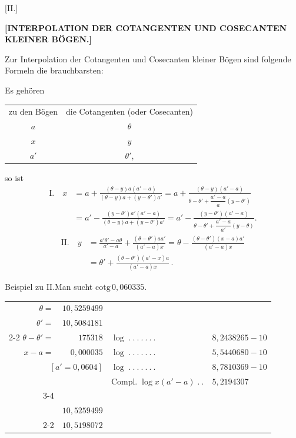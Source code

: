 \clearpage{}
\begin{center}
[II.]

\medskip
\textbf{[INTERPOLATION DER COTANGENTEN UND COSECANTEN KLEINER BÖGEN.]}
\end{center}

Zur Interpolation der Cotangenten und Cosecanten kleiner Bögen sind
folgende Formeln die brauchbarsten:

Es gehören
\begin{center}
\begin{tabular}{cc}
zu den Bögen & die Cotangenten (oder Cosecanten) \\
$a$ & $\theta$ \\
$x$ & $y$ \\
$a'$ & $\theta'$, \\
\end{tabular}
\end{center}
so ist
\[
\begin{aligned}
\mathrm{I.}\quad x &= a+\frac{(\theta-y)a(a'-a)}{(\theta-y)a+(y-\theta')a'}
=a+\frac{(\theta-y)(a'-a)}{\theta-\theta'+\dfrac{a'-a}{a}(y-\theta')}\\[5pt]
&=a'-\frac{(y-\theta')a'(a'-a)}{(\theta-y)a+(y-\theta')a'}
=a'-\frac{(y-\theta')(a'-a)}{\theta-\theta'+\dfrac{a'-a}{a'}(y-\theta)}.
\end{aligned}
\]
\[
\begin{aligned}
\mathrm{II.}\quad y&=\frac{a'\theta'-a\theta}{a'-a}+\frac{(\theta-\theta')aa'}{(a'-a)x}
=\theta-\frac{(\theta-\theta')(x-a)a'}{(a'-a)x}\\[5pt]
&=\theta'+\frac{(\theta-\theta')(a'-x)a}{(a'-a)x}\,.
\end{aligned}
\]

Beispiel zu II.\quad Man sucht $\mathrm{cotg}\,0{,}060335$.
\begin{center}\small
\begin{tabular}{r@{\;}r@{\quad}l@{\;}l}
$\theta=$ & $10{,}5259499$ &&\\
$\theta'=$ & $10{,}5084181$ &&\\\cline{2-2}
$\theta-\theta'=$ & $175318$ & $\log\; .\ .\ .\ .\ .\ .\ .$ & $8{,}2438265-10$\\
$x-a=$ & $0{,}000035$ & $\log\; .\ .\ .\ .\ .\ .\ .$ & $5{,}5440680-10$\\
\multicolumn{2}{r}{$[a'=0{,}0604]$} & $\log\; .\ .\ .\ .\ .\ .\ .$ & $8{,}7810369-10$\\
&& $\mathrm{Compl.}\;\log x(a'-a)\; .\ .$ & $5{,}2194307$\\\cline{3-4}
\multicolumn{4}{r}{$0{,}00614274\; .\ .\ .\ .\ .\ .\ .\ .\ .\ .\ .\ .\ .\ .\ .\ .\ .\ .\ .\ .\;7{,}7883621-10$}\\
&$10{,}5259499$&&\\\cline{2-2}
&$10{,}5198072$&&
\end{tabular}
\end{center}
